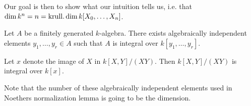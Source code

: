 Our goal is then to show what our intuition tells us, i.e. that $\dim k^n = n = \operatorname{krull.dim} k[X_0, \ldots, X_n]$. 

\begin{lemma}
Let $A$ be a finitely generated $k$-algebra. There exists algebraically independent elements $y_1, \ldots, y_r \in A$ such that $A$ is integral over $k[y_1, \ldots, y_r]$. 
\end{lemma}

\begin{example}
Let $x$ denote the image of $X$ in $k[X, Y]/(XY)$. Then $k[X, Y]/(XY)$ is integral over $k[x]$.
\end{example}

Note that the number of these algebraically independent elements used in Noethers normalization lemma is going to be the dimension. 

